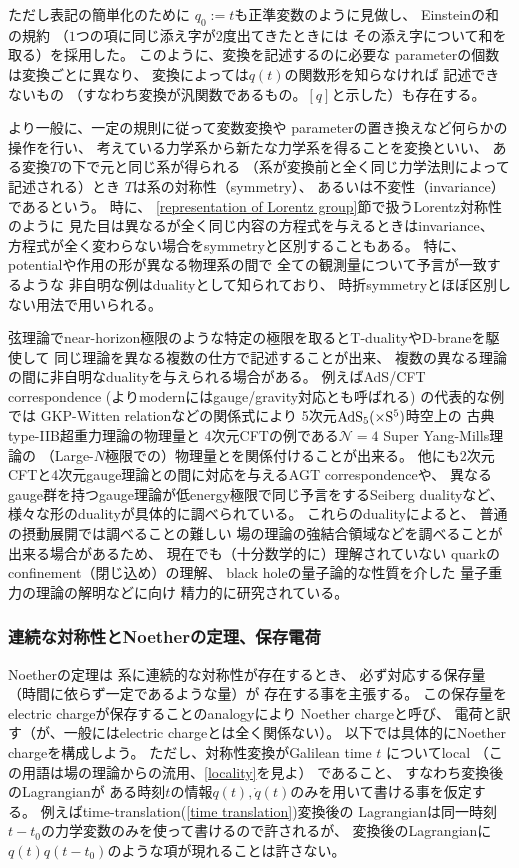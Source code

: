 ただし表記の簡単化のために
$q_0 := t$も正準変数のように見做し、
Einsteinの和の規約
（$1$つの項に同じ添え字が$2$度出てきたときには
その添え字について和を取る）を採用した。
このように、変換を記述するのに必要な
parameterの個数は変換ごとに異なり、
変換によっては$q(t)$の関数形を知らなければ
記述できないもの
（すなわち変換が汎関数であるもの。$[q]$と示した）も存在する。

より一般に、一定の規則に従って変数変換や
parameterの置き換えなど何らかの操作を行い、
考えている力学系から新たな力学系を得ることを変換といい、
ある変換$T$の下で元と同じ系が得られる
（系が変換前と全く同じ力学法則によって記述される）とき
$T$は系の対称性（symmetry）、
あるいは不変性（invariance）であるという。
時に、
\ref{representation of Lorentz group}節で扱うLorentz対称性のように
見た目は異なるが全く同じ内容の方程式を与えるときはinvariance、
方程式が全く変わらない場合をsymmetryと区別することもある。
特に、potentialや作用の形が異なる物理系の間で
全ての観測量について予言が一致するような
非自明な例はdualityとして知られており、
時折symmetryとほぼ区別しない用法で用いられる。

弦理論でnear-horizon極限のような特定の極限を取るとT-dualityやD-braneを駆使して
同じ理論を異なる複数の仕方で記述することが出来、
複数の異なる理論の間に非自明なdualityを与えられる場合がある。
例えばAdS/CFT correspondence
(よりmodernにはgauge/gravity対応とも呼ばれる)
の代表的な例では
GKP-Witten relationなどの関係式により
5次元$\rm{AdS}_5(\times S^5)$時空上の
古典type-IIB超重力理論の物理量と
4次元CFTの例である$\mathcal{N}=4$ Super Yang-Mills理論の
（Large-$N$極限での）物理量とを関係付けることが出来る。
他にも$2$次元CFTと$4$次元gauge理論との間に対応を与えるAGT correspondenceや、
異なるgauge群を持つgauge理論が低energy極限で同じ予言をするSeiberg dualityなど、
様々な形のdualityが具体的に調べられている。
これらのdualityによると、
普通の摂動展開では調べることの難しい
場の理論の強結合領域などを調べることが出来る場合があるため、
現在でも（十分数学的に）理解されていない
quarkのconfinement（閉じ込め）の理解、
black holeの量子論的な性質を介した
量子重力の理論の解明などに向け
精力的に研究されている。

\subsubsection{連続な対称性とNoetherの定理、保存電荷}

Noetherの定理は
系に連続的な対称性が存在するとき、
必ず対応する保存量（時間に依らず一定であるような量）が
存在する事を主張する。
この保存量をelectric chargeが保存することのanalogyにより
Noether chargeと呼び、
電荷と訳す（が、一般にはelectric chargeとは全く関係ない）。
以下では具体的にNoether chargeを構成しよう。
ただし、対称性変換がGalilean time $t$
についてlocal
（この用語は場の理論からの流用、\ref{locality}を見よ）
であること、
すなわち変換後のLagrangianが
ある時刻$t$の情報$q(t), \dot{q}(t)$のみを用いて書ける事を仮定する。
例えばtime-translation(\ref{time translation})変換後の
Lagrangianは同一時刻$t - t_0$の力学変数のみを使って書けるので許されるが、
変換後のLagrangianに
$q(t)q(t-t_0)$のような項が現れることは許さない。


